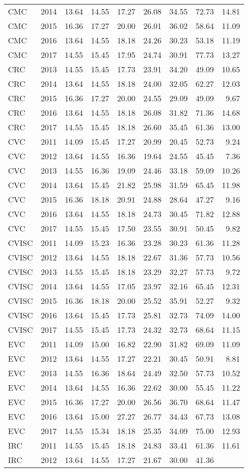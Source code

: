 \documentclass[]{article}
\begin{document}
\begin{longtable}[]{@{}lrrrrrrrr@{}}
CMC & 2014 & 13.64 & 14.55 & 17.27 & 26.08 & 34.55 & 72.73 &
14.81\tabularnewline
CMC & 2015 & 16.36 & 17.27 & 20.00 & 26.01 & 36.02 & 58.64 &
11.09\tabularnewline
CMC & 2016 & 13.64 & 14.55 & 18.18 & 24.26 & 30.23 & 53.18 &
11.19\tabularnewline
CMC & 2017 & 14.55 & 15.45 & 17.95 & 24.74 & 30.91 & 77.73 &
13.27\tabularnewline
CRC & 2013 & 14.55 & 15.45 & 17.73 & 23.91 & 34.20 & 49.09 &
10.65\tabularnewline
CRC & 2014 & 13.64 & 14.55 & 18.18 & 24.00 & 32.05 & 62.27 &
12.03\tabularnewline
CRC & 2015 & 16.36 & 17.27 & 20.00 & 24.55 & 29.09 & 49.09 &
9.67\tabularnewline
CRC & 2016 & 13.64 & 14.55 & 18.18 & 26.08 & 31.82 & 71.36 &
14.68\tabularnewline
CRC & 2017 & 14.55 & 15.45 & 18.18 & 26.60 & 35.45 & 61.36 &
13.00\tabularnewline
CVC & 2011 & 14.09 & 15.45 & 17.27 & 20.99 & 20.45 & 52.73 &
9.24\tabularnewline
CVC & 2012 & 13.64 & 14.55 & 16.36 & 19.64 & 24.55 & 45.45 &
7.36\tabularnewline
CVC & 2013 & 14.55 & 16.36 & 19.09 & 24.46 & 33.18 & 59.09 &
10.26\tabularnewline
CVC & 2014 & 13.64 & 15.45 & 21.82 & 25.98 & 31.59 & 65.45 &
11.98\tabularnewline
CVC & 2015 & 16.36 & 18.18 & 20.91 & 24.88 & 28.64 & 47.27 &
9.16\tabularnewline
CVC & 2016 & 13.64 & 14.55 & 18.18 & 24.73 & 30.45 & 71.82 &
12.88\tabularnewline
CVC & 2017 & 14.55 & 15.45 & 17.50 & 23.55 & 30.91 & 50.45 &
9.82\tabularnewline
CVISC & 2011 & 14.09 & 15.23 & 16.36 & 23.28 & 30.23 & 61.36 &
11.28\tabularnewline
CVISC & 2012 & 13.64 & 14.55 & 18.18 & 22.67 & 31.36 & 57.73 &
10.56\tabularnewline
CVISC & 2013 & 14.55 & 15.45 & 18.18 & 23.29 & 32.27 & 57.73 &
9.72\tabularnewline
CVISC & 2014 & 13.64 & 14.55 & 17.05 & 23.97 & 32.16 & 65.45 &
12.31\tabularnewline
CVISC & 2015 & 16.36 & 18.18 & 20.00 & 25.52 & 35.91 & 52.27 &
9.32\tabularnewline
CVISC & 2016 & 13.64 & 15.45 & 17.73 & 25.81 & 32.73 & 74.09 &
14.00\tabularnewline
CVISC & 2017 & 14.55 & 15.45 & 17.73 & 24.32 & 32.73 & 68.64 &
11.15\tabularnewline
EVC & 2011 & 14.09 & 15.00 & 16.82 & 22.90 & 31.82 & 69.09 &
11.09\tabularnewline
EVC & 2012 & 13.64 & 14.55 & 17.27 & 22.21 & 30.45 & 50.91 &
8.81\tabularnewline
EVC & 2013 & 14.55 & 16.36 & 18.64 & 24.49 & 32.50 & 57.73 &
10.52\tabularnewline
EVC & 2014 & 13.64 & 14.55 & 16.36 & 22.62 & 30.00 & 55.45 &
11.22\tabularnewline
EVC & 2015 & 16.36 & 17.27 & 20.00 & 26.56 & 36.70 & 68.64 &
11.47\tabularnewline
EVC & 2016 & 13.64 & 15.00 & 27.27 & 26.77 & 34.43 & 67.73 &
13.08\tabularnewline
EVC & 2017 & 14.55 & 15.34 & 18.18 & 25.35 & 34.09 & 75.00 &
12.93\tabularnewline
IRC & 2011 & 14.55 & 15.45 & 18.18 & 24.83 & 33.41 & 61.36 &
11.61\tabularnewline
IRC & 2012 & 13.64 & 14.55 & 17.27 & 21.67 & 30.00 & 41.36 &

\end{longtable}
\end{document}
